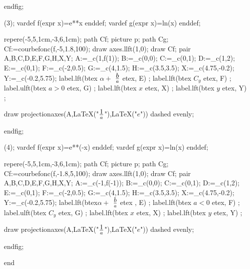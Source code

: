 endfig;

\beginfig(3);
vardef f(expr x)=e**x enddef;
vardef g(expr x)=ln(x) enddef;


repere(-5,5,1cm,-3,6,1cm);
 path Cf; picture p; path Cg;
 Cf:=courbefonc(f,-5,1.8,100);
 draw axes.llft(1,0);
 draw Cf;
 pair A,B,C,D,E,F,G,H,X,Y;
 A:=_c(1,f(1));
 B:=_c(0,0);
 C:=_c(0,1);
 D:=_c(1,2);
 E:=_c(0,1);
 F:=_c(-2,0.5);
 G:=_c(4,1.5);
 H:=_c(3.5,3.5);
 X:=_c(4.75,-0.2);
 Y:=_c(-0.2,5.75);
 label.lft(btex $ \alpha +$  $\displaystyle  {b}\over{a}$ etex, E) ;
 label.lft(btex $ C_{y} $ etex, F) ;
  label.ulft(btex $a>0$ etex, G) ;
    label.lft(btex $x$ etex, X) ;
    label.lft(btex $y$ etex, Y) ;


 draw projectionaxes(A,LaTeX("$\displaystyle 1 \over a$"),LaTeX("$e$")) dashed evenly;
 
endfig;

\beginfig(4);
vardef f(expr x)=e**(-x) enddef;
vardef g(expr x)=ln(x) enddef;


repere(-5,5,1cm,-3,6,1cm);
 path Cf; picture p; path Cg;
 Cf:=courbefonc(f,-1.8,5,100);
 draw axes.llft(1,0);
 draw Cf;
 pair A,B,C,D,E,F,G,H,X,Y;
 A:=_c(-1,f(-1));
 B:=_c(0,0);
 C:=_c(0,1);
 D:=_c(1,2);
 E:=_c(0,1);
 F:=_c(-2,0.5);
 G:=_c(4,1.5);
 H:=_c(3.5,3.5);
 X:=_c(4.75,-0.2);
 Y:=_c(-0.2,5.75);
 label.lft(btex$ \alpha +$  $\displaystyle {b}\over{a}$ etex , E) ;
 label.lft(btex $ a<0$ etex, F) ;
  label.ulft(btex $C_y$ etex, G) ;
    label.lft(btex $x$ etex, X) ;
    label.lft(btex $y$ etex, Y) ;


 draw projectionaxes(A,LaTeX("$\displaystyle 1 \over a$"),LaTeX("$e$")) dashed evenly;
 
endfig;








end

